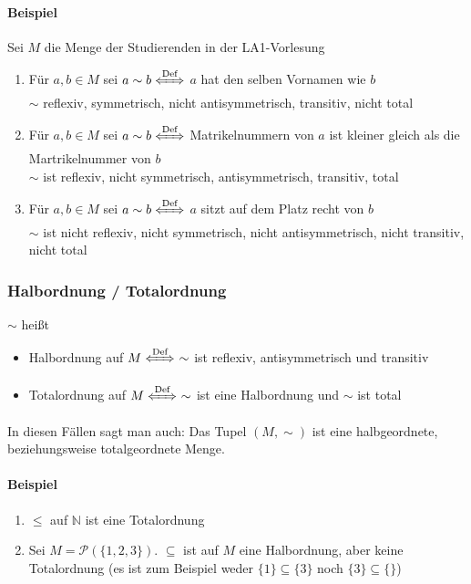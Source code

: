 \documentclass[a4paper]{scrartcl}
\theoremstyle{definition}
\theoremstyle{plain}
\theoremstyle{plain}
\theoremstyle{remark}
\theoremstyle{remark}
\theoremstyle{remark}
\theoremstyle{remark}
\theoremstyle{remark}
\begin{document}
\paragraph{Beispiel}
\label{sec-2-5-2-1}
Sei $M$ die Menge der Studierenden in der LA1-Vorlesung
\begin{enumerate}
\item Für $a,b \in M$ sei $a\sim b \xLeftrightarrow{\text{Def}}$ $a$ hat den selben Vornamen wie $b$ \\
        $\sim$ reflexiv, symmetrisch, nicht antisymmetrisch, transitiv, nicht total
\item Für $a,b \in M$ sei $a\sim b \xLeftrightarrow{\text{Def}}$ Matrikelnummern von $a$ ist kleiner gleich als die Martrikelnummer von $b$ \\
        $\sim$ ist reflexiv, nicht symmetrisch, antisymmetrisch, transitiv, total
\item Für $a,b \in M$ sei $a\sim b \xLeftrightarrow{\text{Def}}$ $a$ sitzt auf dem Platz recht von $b$ \\
        $\sim$ ist nicht reflexiv, nicht symmetrisch, nicht antisymmetrisch, nicht transitiv, nicht total
\end{enumerate}
\subsubsection{Halbordnung / Totalordnung}
\label{sec-2-5-3}
$\sim$ heißt
\begin{itemize}
\item Halbordnung auf $M\xLeftrightarrow{\text{Def}}~\sim$ ist reflexiv, antisymmetrisch und transitiv
\item Totalordnung auf $M\xLeftrightarrow{\text{Def}}~\sim$ ist eine Halbordnung und $\sim$ ist total
\end{itemize}
In diesen Fällen sagt man auch: Das Tupel $(M,\sim)$ ist eine halbgeordnete, beziehungsweise totalgeordnete Menge.
\paragraph{Beispiel}
\label{sec-2-5-3-1}
\begin{enumerate}
\item $\leq$ auf $\mathbb{N}$ ist eine Totalordnung
\item Sei $M = \mathcal{P}(\{1,2,3\})$. $\subseteq$ ist auf $M$ eine Halbordnung, aber keine Totalordnung (es ist zum Beispiel weder $\{1\} \subseteq \{3\}$ noch $\{3\}\subseteq \{\}$)
\end{enumerate}
\end{document}
